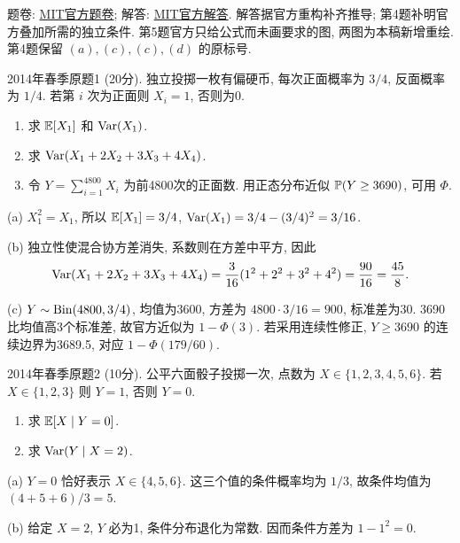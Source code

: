 题卷: \href{https://ocw.mit.edu/courses/18-600-probability-and-random-variables-fall-2019/resources/mit18_600f19_mid2_2014/}{MIT官方题卷}; 解答: \href{https://ocw.mit.edu/courses/18-600-probability-and-random-variables-fall-2019/resources/mit18_600f19_mid2_2014_soln/}{MIT官方解答}. 解答据官方重构补齐推导; 第4题补明官方叠加所需的独立条件. 第5题官方只给公式而未画要求的图, 两图为本稿新增重绘. 第4题保留 $(a),(c),(c),(d)$ 的原标号.

\begin{exercise}\label{m2:2014s:q1}
2014年春季原题1 (20分). 独立投掷一枚有偏硬币, 每次正面概率为 $3/4$, 反面概率为 $1/4$. 若第 $i$ 次为正面则 $X_i=1$, 否则为0.
\begin{enumerate}
\item[(a)]\label{m2:2014s:q1:a} 求 $\mathbb E[X_1]$ 和 $\operatorname{Var}(X_1)$.
\item[(b)]\label{m2:2014s:q1:b} 求 $\operatorname{Var}(X_1+2X_2+3X_3+4X_4)$.
\item[(c)]\label{m2:2014s:q1:c} 令 $Y=\sum_{i=1}^{4800}X_i$ 为前4800次的正面数. 用正态分布近似 $\mathbb P(Y\ge3690)$, 可用 $\Phi$.
\end{enumerate}
\end{exercise}
\begin{solution}
(a) $X_1^2=X_1$, 所以 $\mathbb E[X_1]=3/4$, $\operatorname{Var}(X_1)=3/4-(3/4)^2=3/16$.

(b) 独立性使混合协方差消失, 系数则在方差中平方, 因此
\[
\operatorname{Var}(X_1+2X_2+3X_3+4X_4)=\frac3{16}(1^2+2^2+3^2+4^2)=\frac{90}{16}=\frac{45}8.
\]

(c) $Y\sim\operatorname{Bin}(4800,3/4)$, 均值为3600, 方差为 $4800\cdot3/16=900$, 标准差为30. 3690比均值高3个标准差, 故官方近似为 $1-\Phi(3)$. 若采用连续性修正, $Y\ge3690$ 的连续边界为3689.5, 对应 $1-\Phi(179/60)$.
\end{solution}

\begin{exercise}\label{m2:2014s:q2}
2014年春季原题2 (10分). 公平六面骰子投掷一次, 点数为 $X\in\{1,2,3,4,5,6\}$. 若 $X\in\{1,2,3\}$ 则 $Y=1$, 否则 $Y=0$.
\begin{enumerate}
\item[(a)]\label{m2:2014s:q2:a} 求 $\mathbb E[X\mid Y=0]$.
\item[(b)]\label{m2:2014s:q2:b} 求 $\operatorname{Var}(Y\mid X=2)$.
\end{enumerate}
\end{exercise}
\begin{solution}
(a) $Y=0$ 恰好表示 $X\in\{4,5,6\}$. 这三个值的条件概率均为 $1/3$, 故条件均值为 $(4+5+6)/3=5$.

(b) 给定 $X=2$, $Y$ 必为1, 条件分布退化为常数. 因而条件方差为 $1-1^2=0$.
\end{solution}

